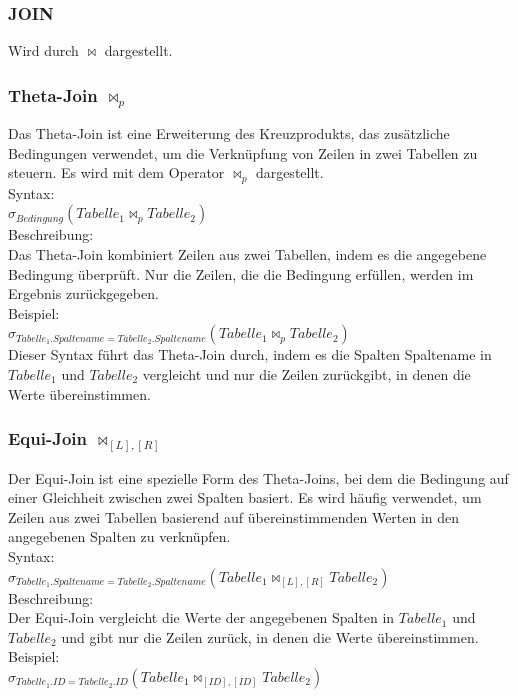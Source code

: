 \documentclass[12pt,a4paper]{article}
\begin{document}
		\subsubsection{JOIN}
			Wird durch $\Join$ dargestellt.

		\subsubsection{Theta-Join $\Join_p$}
			Das Theta-Join ist eine Erweiterung des Kreuzprodukts, das zusätzliche Bedingungen verwendet, um die Verknüpfung von Zeilen in zwei Tabellen zu steuern. Es wird mit dem Operator $ \Join_p $ dargestellt.\\
			Syntax:\\
			$ \sigma_{Bedingung}(Tabelle_1 \Join_p Tabelle_2) $\\
			Beschreibung:\\
			Das Theta-Join kombiniert Zeilen aus zwei Tabellen, indem es die angegebene Bedingung überprüft. Nur die Zeilen, die die Bedingung erfüllen, werden im Ergebnis zurückgegeben.\\
			Beispiel:\\
			$ \sigma_{Tabelle_1.Spaltename = Tabelle_2.Spaltename}(Tabelle_1 \Join_p Tabelle_2) $\\
			Dieser Syntax führt das Theta-Join durch, indem es die Spalten Spaltename in $Tabelle_1$ und $Tabelle_2$ vergleicht und nur die Zeilen zurückgibt, in denen die Werte übereinstimmen.

		\subsubsection{Equi-Join $\Join_{[L],[R]}$}
			Der Equi-Join ist eine spezielle Form des Theta-Joins, bei dem die Bedingung auf einer Gleichheit zwischen zwei Spalten basiert. Es wird häufig verwendet, um Zeilen aus zwei Tabellen basierend auf übereinstimmenden Werten in den angegebenen Spalten zu verknüpfen.\\
			Syntax:\\
			$\sigma_{Tabelle_1.Spaltename = Tabelle_2.Spaltename}(Tabelle_1 \Join_{[L],[R]} Tabelle_2)$\\
			Beschreibung:\\
			Der Equi-Join vergleicht die Werte der angegebenen Spalten in $Tabelle_1$ und $Tabelle_2$ und gibt nur die Zeilen zurück, in denen die Werte übereinstimmen.\\
			Beispiel:\\
			$\sigma_{Tabelle_1.ID = Tabelle_2.ID}(Tabelle_1 \Join_{[ID],[ID]} Tabelle_2)$
\end{document}
